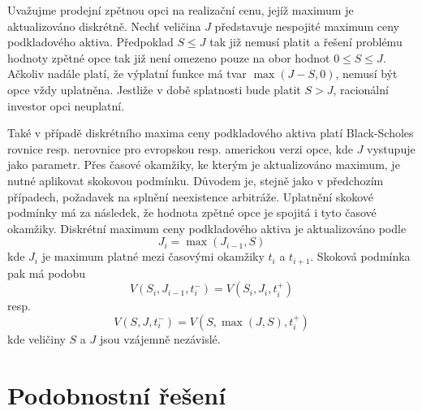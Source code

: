 \documentclass[a4paper]{book}
\begin{document}
Uvažujme prodejní zpětnou opci na realizační cenu, jejíž maximum je aktualizováno diskrétně. Nechť veličina $J$ představuje nespojité maximum ceny podkladového aktiva. Předpoklad $S \le J$ tak již nemusí platit a řešení problému hodnoty zpětné opce tak již není omezeno pouze na obor hodnot $0 \le S \le J$. Ačkoliv nadále platí, že výplatní funkce má tvar $\max(J - S, 0)$, nemusí být opce vždy uplatněna. Jestliže v době splatnosti bude platit $S > J$, racionální investor opci neuplatní.

Také v případě diskrétního maxima ceny podkladového aktiva platí Black-Scholes rovnice resp. nerovnice pro evropskou resp. americkou verzi opce, kde $J$ vystupuje jako parametr. Přes časové okamžiky, ke kterým je aktualizováno maximum, je nutné aplikovat skokovou podmínku. Důvodem je, stejně jako v předchozím případech, požadavek na splnění neexistence arbitráže. Uplatnění skokové podmínky má za následek, že hodnota zpětné opce je spojitá i tyto časové okamžiky. Diskrétní maximum ceny podkladového aktiva je aktualizováno podle
\begin{equation*}
J_i = \max(J_{i-1}, S)
\end{equation*}
kde $J_i$ je maximum platné mezi časovými okamžiky $t_i$ a $t_{i+1}$. Skoková podmínka pak má podobu
\begin{equation*}
V(S_i, J_{i-1}, t_i^{-}) = V(S_i, J_i, t_i^{+})
\end{equation*}
resp.
\begin{equation*}
V(S, J, t_i^{-}) = V(S, \max(J,S), t_i^{+})
\end{equation*}
kde veličiny $S$ a $J$ jsou vzájemně nezávislé.

\section{Podobnostní řešení}
\end{document}
